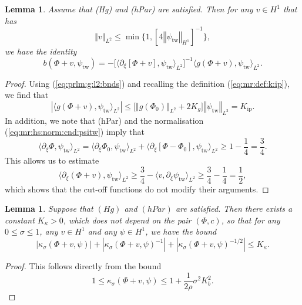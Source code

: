 \documentclass[10pt]{articleHJ}
\newcommand{\abs}[1]{\left\vert#1\right\vert}			%
\newcommand{\norm}[1]{\left\Vert#1\right\Vert}		%
\newcommand{\sref}[1]{(\ref{#1})}                       %
\newtheorem{lem}[thm]{Lemma}
\numberwithin{equation}{section}
\begin{document}
\begin{lem}
\label{lem:prlm:b:without:cutoffs}
Assume that (Hg) and (hPar) are satisfied.
Then for any $v \in H^1$ that has
\begin{equation}
  \norm{v}_{L^2} \le \min \{1 , [4 \norm{\psi_{\mathrm{tw}}}_{H^1} ]^{-1} \},
\end{equation}
we have the identity
\begin{equation}
\label{eq:prlm:id:for:b:without:cutoffs}
b(\Phi + v, \psi_{\mathrm{tw}} ) =
- \big[\langle \partial_\xi [\Phi + v] , \psi_{\mathrm{tw}} \rangle_{L^2} \big]^{-1}
\langle g(\Phi + v) , \psi_{\mathrm{tw}} \rangle_{L^2}.
\end{equation}
\end{lem}
\begin{proof}
Using \sref{eq:prlm:g:l2:bnds}
and recalling
the definition
\sref{eq:mr:def:k:ip},
we find that
\begin{equation}
\abs{\langle g(\Phi + v), \psi_{\mathrm{tw}} \rangle_{L^2} }
\le
\Big[ \norm{g(\Phi_0)}_{L^2} + 2 K_g \Big]
  \norm{\psi_{\mathrm{tw}}}_{L^2}
= K_{\mathrm{ip}}.
\end{equation}
In addition, we note that
(hPar) and the normalisation
\sref{eq:mr:hs:norm:cnd:psitw}
imply that
\begin{equation}
 \langle \partial_\xi \Phi  , \psi_{\mathrm{tw}} \rangle_{L^2}
  =  \langle \partial_\xi \Phi_{0} ,  \psi_{\mathrm{tw}}
         \rangle_{L^2}
  + \langle \partial_\xi [ \Phi - \Phi_{0} ],
        \psi_{\mathrm{tw}} \rangle_{L^2}
  \ge 1 - \frac{1}{4} = \frac{3}{4}.
\end{equation}
This allows us to estimate
\begin{equation}
\langle \partial_\xi (\Phi + v) , \psi_{\mathrm{tw}}
 \rangle_{L^2}
\ge
\frac{3}{4} -
\langle v, \partial_\xi \psi_{\mathrm{tw}} \rangle_{L^2}
 \ge
\frac{3}{4} - \frac{1}{4}
= \frac{1}{2},
\end{equation}
which shows that the cut-off functions
do not modify their arguments.
\end{proof}







\begin{lem}
\label{lem:prlm:bnds:kappa}
Suppose that $(Hg)$ and $(hPar)$
are satisfied.
Then there exists a constant $K_{\kappa} > 0$, which does not
depend on the pair $(\Phi, c)$, so that %
for any
$0 \le \sigma \le 1$,
any
$v \in H^1$
and any $\psi\in H^1$,
we have the bound
\begin{equation}
\label{eq:prlm:kappa:glb:ests}
\abs{ \kappa_{\sigma}(\Phi + v, \psi) }
+ \abs{ \kappa_{\sigma}(\Phi + v, \psi)^{-1} }
+ \abs{ \kappa_{\sigma}(\Phi + v, \psi)^{-1/2} }
  \le K_{\kappa} .
\end{equation}
\end{lem}
\begin{proof}
This follows directly from the bound
\begin{equation}
1 \le \kappa_{\sigma}(\Phi + v, \psi) \le
  1 + \frac{1}{2\rho} \sigma^2 K_b^2.
\end{equation}
\end{proof}
\end{document}
